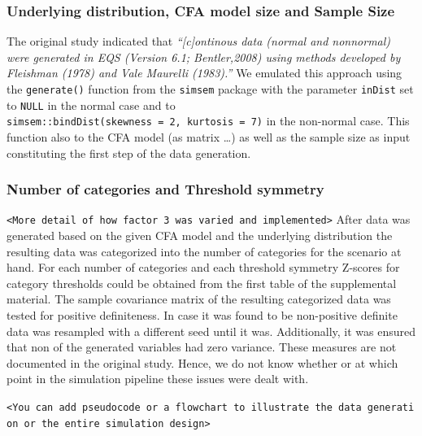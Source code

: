 \documentclass[10,a4paperpaper,]{article}
\begin{document}
\subsubsection{Underlying distribution, CFA model size and Sample Size}

The original study indicated that \emph{``{[}c{]}ontinous data (normal
and nonnormal) were generated in EQS (Version 6.1; Bentler,2008) using
methods developed by Fleishman (1978) and Vale Maurelli (1983).''} We
emulated this approach using the \texttt{generate()} function from the
\texttt{simsem} package with the parameter \texttt{inDist} set to
\texttt{NULL} in the normal case and to
\texttt{simsem::bindDist(skewness\ =\ 2,\ kurtosis\ =\ 7)} in the
non-normal case. This function also to the CFA model (as matrix \ldots)
as well as the sample size as input constituting the first step of the
data generation.

\subsubsection{Number of categories and Threshold symmetry}

\texttt{\textless{}More\ detail\ of\ how\ factor\ 3\ was\ varied\ and\ implemented\textgreater{}}
After data was generated based on the given CFA model and the underlying
distribution the resulting data was categorized into the number of
categories for the scenario at hand. For each number of categories and
each threshold symmetry Z-scores for category thresholds could be
obtained from the first table of the supplemental material. The sample
covariance matrix of the resulting categorized data was tested for
positive definiteness. In case it was found to be non-positive definite
data was resampled with a different seed until it was. Additionally, it
was ensured that non of the generated variables had zero variance. These
measures are not documented in the original study. Hence, we do not know
whether or at which point in the simulation pipeline these issues were
dealt with.

\texttt{\textless{}You\ can\ add\ pseudocode\ or\ a\ flowchart\ to\ illustrate\ the\ data\ generation\ or\ the\ entire\ simulation\ design\textgreater{}}
\end{document}
